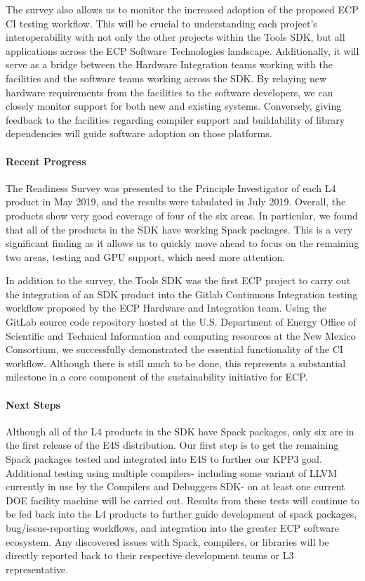 The survey also allows us to monitor the increased adoption of the proposed ECP CI testing workflow. This will be crucial to understanding each project’s interoperability with not only the other projects within the Tools SDK, but all applications across the ECP Software Technologies landscape. Additionally, it will serve as a bridge between the Hardware Integration teams working with the facilities and the software teams working across the SDK. By relaying new hardware requirements from the facilities to the software developers, we can closely monitor support for both new and existing systems. Conversely, giving feedback to the facilities regarding compiler support and buildability of library dependencies will guide software adoption on those platforms.

\paragraph{Recent Progress}
The Readiness Survey was presented to the Principle Investigator of each L4 product in May 2019, and the results were tabulated in July 2019. Overall, the products show very good coverage of four of the six areas. In particular, we found that all of the products in the SDK have working Spack packages. This is a very significant finding as it allows us to quickly move ahead to focus on the remaining two areas, testing and GPU support, which need more attention.

In addition to the survey, the Tools SDK was the first ECP project to carry out the integration of an SDK product into the Gitlab Continuous Integration testing workflow proposed by the ECP Hardware and Integration team. Using the GitLab source code repository hosted at the U.S. Department of Energy Office of Scientific and Technical Information and computing resources at the New Mexico Consortium, we successfully demonstrated the essential functionality of the CI workflow. Although there is still much to be done, this represents a substantial milestone in a core component of the sustainability initiative for ECP.


\paragraph{Next Steps}
Although all of the L4 products in the SDK have Spack packages, only six are in the first release of the E4S distribution. Our first step is to get the remaining Spack packages tested and integrated into E4S to further our KPP3 goal. Additional testing using multiple compilers- including some variant of LLVM currently in use by the Compilers and Debuggers SDK- on at least one current DOE facility machine will be carried out. Results from these tests will continue to be fed back into the L4 products to further guide development of spack packages, bug/issue-reporting workflows, and integration into the greater ECP software ecosystem. Any discovered issues with Spack, compilers, or libraries will be directly reported back to their respective development teams or L3 representative.

